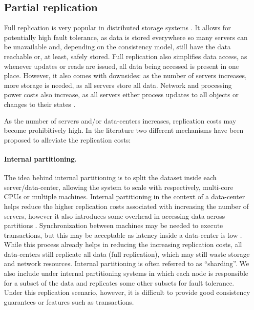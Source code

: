 \subsection{Partial replication}
\label{subsec:partial}

Full replication is very popular in distributed storage systems \cite{sipre}. 
It allows for potentially high fault tolerance, as data is stored everywhere so many servers can be unavailable and, depending on the consistency model, still have the data reachable or, at least, safely stored.
Full replication also simplifies data access, as whenever updates or reads are issued, all data being accessed is present in one place.
However, it also comes with downsides: as the number of servers increases, more storage is needed, as all servers store all data.
Network and processing power costs also increase, as all servers either process updates to all objects or changes to their states \cite{sipre}.

As the number of servers and/or data-centers increases, replication costs may become prohibitively high.
In the literature two different mechanisms have been proposed to alleviate the replication costs:

\paragraph{Internal partitioning.}
The idea behind internal partitioning is to split the dataset inside each server/data-center, allowing the system to scale with respectively, multi-core CPUs or multiple machines.
Internal partitioning in the context of a data-center helps reduce the higher replication costs associated with increasing the number of servers, however it also introduces some overhead in accessing data across partitions \cite{dynamo, cops, mdcc}.
Synchronization between machines may be needed to execute transactions, but this may be acceptable as latency inside a data-center is low \cite{cops}.
While this process already helps in reducing the increasing replication costs, all data-centers still replicate all data (full replication), which may still waste storage and network resources.
Internal partitioning is often referred to as ``sharding''.
We also include under internal partitioning systems \cite{dynamo} in which each node is responsible for a subset of the data and replicates some other subsets for fault tolerance.
Under this replication scenario, however, it is difficult to provide good consistency guarantees or features such as transactions.

